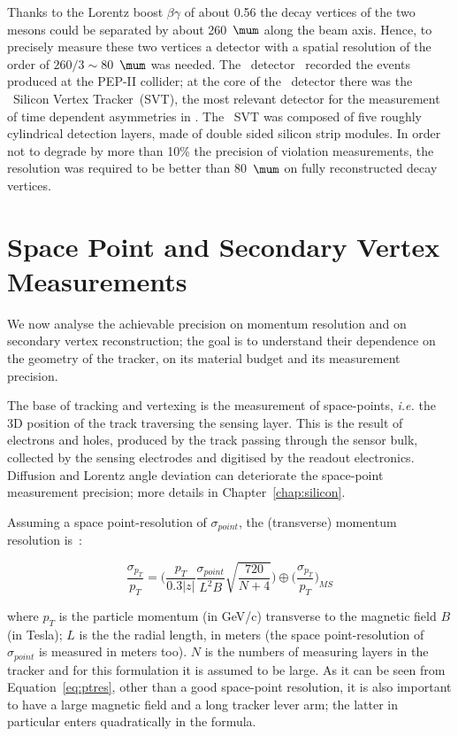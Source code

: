 Thanks to the Lorentz boost $\beta\gamma$ of about 0.56 the decay vertices of the two \B mesons 
could be separated by about 260~$\mum$ along the beam axis. Hence, to precisely measure these 
two vertices a detector with a spatial resolution of the order of $260/3\sim80$~$\mum$ was needed.
The \babar~detector~\cite{AUBERT20021} recorded the events produced at the PEP-II collider; 
at the core of the \babar~detector there was the \babar~Silicon Vertex Tracker~(SVT),  the most relevant detector for the measurement of time dependent \CP asymmetries in \babar. The \babar~SVT 
was composed of five roughly cylindrical detection layers, made of double sided silicon strip modules. 
In order not to degrade by more than 10\% the precision of  \CP violation measurements, the resolution 
was required to be better than 80~$\mum$ on fully reconstructed \B decay vertices.

\section{Space Point and Secondary Vertex Measurements}
\label{sec:SPmeas}

We now analyse the achievable precision on momentum resolution and on secondary vertex 
reconstruction; the goal is to understand their dependence on the geometry of the tracker, on its 
material budget and its measurement precision. 

The base of tracking and vertexing is the measurement of space-points, {\it i.e.} the 3D position 
of the track traversing the sensing layer. This is the result of electrons and holes, produced by the 
track passing through the sensor bulk, collected by the sensing electrodes and digitised by the 
readout electronics. Diffusion and Lorentz angle deviation 
can deteriorate the space-point measurement precision; more details in Chapter~\ref{chap:silicon}.

Assuming a space point-resolution of $\sigma_{point}$, the (transverse) momentum resolution is~\cite{GLUCKSTERN1963381,Olive:2016xmw,Garcia-Sciveres:2017ymt}:

\begin{equation}
\dfrac{\sigma_{p_{T}}}{p_{T}} = \Bigg( \dfrac{p_T}{0.3|z|}\dfrac{\sigma_{point}}{L^2B}\sqrt{\dfrac{720}{N+4}}\Bigg) \oplus \Bigg(\dfrac{\sigma_{p_{T}}}{p_{T}}\Bigg)_{MS}
\label{eq:ptres}
\end{equation} 

where $p_T$ is the particle momentum (in GeV/c) transverse to the magnetic field $B$ (in Tesla); 
$L$ is the the radial length, in meters (the space point-resolution of $\sigma_{point}$ is measured in 
meters too). $N$ is the numbers of measuring layers in the tracker and for this formulation it is 
assumed to be large. As it can be seen from Equation~\ref{eq:ptres}, other than a good 
space-point resolution, it is also important to have a large magnetic field and a long tracker lever 
arm; the latter in particular enters quadratically in the formula. 


